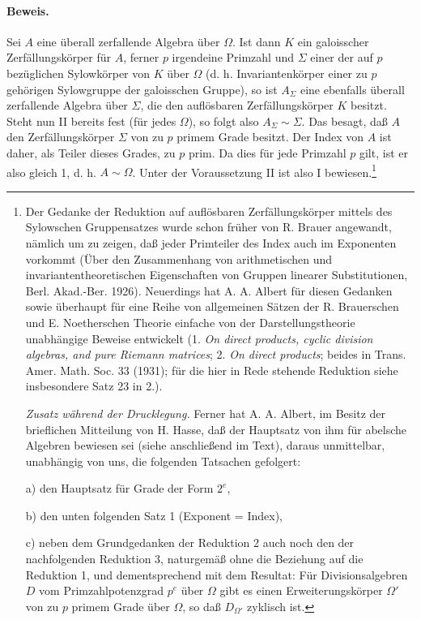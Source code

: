 \paragraph{Beweis.}
Sei \(A\) eine überall zerfallende Algebra über \(\Omega\). Ist dann \(K\) ein galoisscher Zerfällungskörper für \(A\), ferner \(p\) irgendeine Primzahl und \(\Sigma\) einer der auf \(p\) bezüglichen Sylowkörper von \(K\) über \(\Omega\) (d. h. Invariantenkörper einer zu \(p\) gehörigen Sylowgruppe der galoisschen Gruppe), so ist \(A_{\Sigma}\) eine ebenfalls überall zerfallende Algebra über \(\Sigma\), die den auflösbaren Zerfällungskörper \(K\) besitzt. Steht nun II bereits fest (für jedes \(\Omega\)), so folgt also \(A_{\Sigma}\sim \Sigma\). Das besagt, daß \(A\) den Zerfällungskörper \(\Sigma\) von zu \(p\) primem Grade besitzt. Der Index von \(A\) ist daher, als Teiler dieses Grades, zu \(p\) prim. Da dies für jede Primzahl \(p\) gilt, ist er also gleich 1, d. h. \(A\sim\Omega\). Unter der Voraussetzung II ist also I bewiesen.\footnote{Der Gedanke der Reduktion auf auflösbaren Zerfällungskörper mittels des Sylowschen Gruppensatzes wurde schon früher von R. Brauer angewandt, nämlich um zu zeigen, daß jeder Primteiler des Index auch im Exponenten vorkommt (Über den Zusammenhang von arithmetischen und invariantentheoretischen Eigenschaften von Gruppen linearer Substitutionen, Berl. Akad.-Ber. 1926). Neuerdings hat A. A. Albert für diesen Gedanken sowie überhaupt für eine Reihe von allgemeinen Sätzen der R. Brauerschen und E. Noetherschen Theorie einfache von der Darstellungstheorie unabhängige Beweise entwickelt (1. \emph{On direct products, cyclic division algebras, and pure Riemann matrices}; 2. \emph{On direct products}; beides in Trans. Amer. Math. Soc. 33 (1931); für die hier in Rede stehende Reduktion siehe insbesondere Satz 23 in 2.).

\emph{Zusatz während der Drucklegung.} Ferner hat A. A. Albert, im Besitz der brieflichen Mitteilung von H. Hasse, daß der Hauptsatz von ihm für abelsche Algebren bewiesen sei (siehe anschließend im Text), daraus unmittelbar, unabhängig von uns, die folgenden Tatsachen gefolgert:

a) den Hauptsatz für Grade der Form \(2^e\),

b) den unten folgenden Satz 1 (Exponent = Index),

c) neben dem Grundgedanken der Reduktion 2 auch noch den der nachfolgenden Reduktion 3, naturgemäß ohne die Beziehung auf die Reduktion 1, und dementsprechend mit dem Resultat: Für Divisionsalgebren \(D\) vom Primzahlpotenzgrad \(p^e\) über \(\Omega\) gibt es einen Erweiterungskörper \(\Omega'\) von zu \(p\) primem Grade über \(\Omega\), so daß \(D_{\Omega'}\) zyklisch ist.

}
